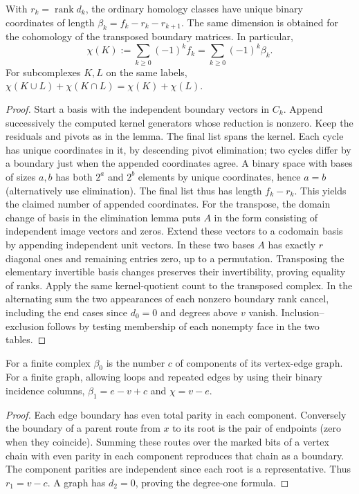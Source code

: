 \begin{theorem}\label{idx-algebraic131}
With $r_k=\operatorname{rank}d_k$, the ordinary homology classes have
unique binary coordinates of length
$\beta_k=f_k-r_k-r_{k+1}$. The same dimension is obtained for the
cohomology of the transposed boundary matrices. In particular,
\[
 \chi(K):=\sum_{k\ge0}(-1)^k f_k
        =\sum_{k\ge0}(-1)^k\beta_k .
\]
For subcomplexes $K,L$ on the same labels,
$\chi(K\cup L)+\chi(K\cap L)=\chi(K)+\chi(L)$.
\end{theorem}
\begin{proof}
Start a basis with the independent boundary vectors in $C_k$. Append
successively the computed kernel generators whose reduction is nonzero.
Keep the residuals and pivots as in the lemma. The final list spans the
kernel. Each cycle has unique coordinates in it, by descending pivot
elimination; two cycles differ by a boundary just when the appended
coordinates agree. A binary space with bases of sizes $a,b$ has both
$2^a$ and $2^b$ elements by unique coordinates, hence $a=b$ (alternatively
use elimination). The final list thus has length $f_k-r_k$. This yields
the claimed number of appended coordinates. For the transpose, the
domain change of basis in the elimination lemma puts $A$ in the form
consisting of independent image vectors and zeros. Extend these vectors
to a codomain basis by appending independent unit vectors. In these two
bases $A$ has exactly $r$ diagonal ones and remaining entries zero, up to
a permutation. Transposing the elementary invertible basis changes
preserves their invertibility, proving equality of ranks. Apply the same
kernel-quotient count to the transposed complex. In the alternating sum
the two appearances of each nonzero boundary rank cancel, including the
end cases since $d_0=0$ and degrees above $v$ vanish.
Inclusion--exclusion follows by testing membership of each nonempty face
in the two tables.
\end{proof}

\begin{corollary}\label{idx-algebraic166}
For a finite complex $\beta_0$ is the number $c$ of components of its
vertex-edge graph. For a finite graph, allowing loops and repeated edges
by using their binary incidence columns, $\beta_1=e-v+c$ and
$\chi=v-e$.
\end{corollary}
\begin{proof}
Each edge boundary has even total parity in each component. Conversely
the boundary of a parent route from $x$ to its root is the pair of
endpoints (zero when they coincide). Summing these routes over the marked
bits of a vertex chain with even parity in each component reproduces that
chain as a boundary. The component parities are independent since each
root is a representative. Thus $r_1=v-c$. A graph has $d_2=0$, proving
the degree-one formula.
\end{proof}

